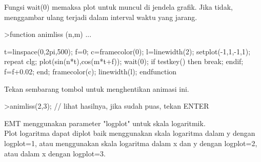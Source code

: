 \documentclass{article}
\begin{document}
\begin{eulernotebook}
\begin{eulercomment}
\begin{eulercomment}
\begin{eulercomment}
\begin{eulercomment}
\begin{eulercomment}
\begin{eulercomment}
\begin{eulercomment}
\begin{eulercomment}
\begin{eulercomment}
\begin{eulercomment}
\begin{eulercomment}
\begin{eulercomment}
\begin{eulercomment}
\begin{eulercomment}
\begin{eulercomment}
\begin{eulercomment}
\begin{eulercomment}
\begin{eulercomment}
\begin{eulercomment}
\begin{eulercomment}
\begin{eulercomment}
\begin{eulercomment}
\begin{eulercomment}
\begin{eulercomment}
\begin{eulercomment}
\begin{eulercomment}
\begin{eulercomment}
Fungsi wait(0) memaksa plot untuk muncul di jendela grafik. Jika
tidak, menggambar ulang terjadi dalam interval waktu yang jarang.
\end{eulercomment}
\begin{eulerprompt}
>function animliss (n,m) ...
\end{eulerprompt}
\begin{eulerudf}
  t=linspace(0,2pi,500);
  f=0;
  c=framecolor(0);
  l=linewidth(2);
  setplot(-1,1,-1,1);
  repeat
    clg;
    plot(sin(n*t),cos(m*t+f));
    wait(0);
    if testkey() then break; endif;
    f=f+0.02;
  end;
  framecolor(c);
  linewidth(l);
  endfunction
\end{eulerudf}
\begin{eulercomment}
Tekan sembarang tombol untuk menghentikan animasi ini.
\end{eulercomment}
\begin{eulerprompt}
>animliss(2,3); // lihat hasilnya, jika sudah puas, tekan ENTER
\end{eulerprompt}
\begin{eulercomment}
EMT menggunakan parameter "logplot" untuk skala logaritmik.\\
Plot logaritma dapat diplot baik menggunakan skala logaritma dalam y
dengan logplot=1, atau menggunakan skala logaritma dalam x dan y
dengan logplot=2, atau dalam x dengan logplot=3.


\end{eulercomment}
\end{eulercomment}
\end{eulercomment}
\end{eulercomment}
\end{eulercomment}
\end{eulercomment}
\end{eulercomment}
\end{eulercomment}
\end{eulercomment}
\end{eulercomment}
\end{eulercomment}
\end{eulercomment}
\end{eulercomment}
\end{eulercomment}
\end{eulercomment}
\end{eulercomment}
\end{eulercomment}
\end{eulercomment}
\end{eulercomment}
\end{eulercomment}
\end{eulercomment}
\end{eulercomment}
\end{eulercomment}
\end{eulercomment}
\end{eulercomment}
\end{eulercomment}
\end{eulercomment}
\end{eulernotebook}
\end{document}
